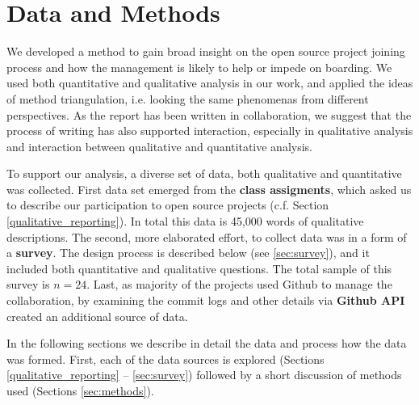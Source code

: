 \section{Data and Methods}

We developed a method to gain broad insight on the open source project joining process and how the management is likely to help or impede on boarding. We used both quantitative and qualitative analysis in our work, and applied the ideas of method triangulation, i.e. looking the same phenomenas from different perspectives. As the report has been written in collaboration, we suggest that the process of writing has also supported interaction, especially in qualitative analysis and interaction between qualitative and quantitative analysis.

To support our analysis, a diverse set of data, both qualitative and quantitative was collected. First data set emerged from the \textbf{class assigments}, which asked us to describe our participation to open source projects (c.f. Section \ref{qualitative_reporting}). In total this data is 45,000 words of qualitative descriptions. The second, more elaborated effort, to collect data was in a form of a \textbf{survey}. The design process is described below (see \ref{sec:survey}), and it included both quantitative and qualitative questions. The total sample of this survey is $n=24$. Last, as majority of the projects used Github to manage the collaboration, by examining the commit logs and other details via \textbf{Github API} created an additional source of data.


In the following sections we describe in detail the data and process how the data was formed. First, each of the data sources is explored (Sections \ref{qualitative_reporting} -- \ref{sec:survey}) followed by a short discussion of methods used (Sections \ref{sec:methods}).

